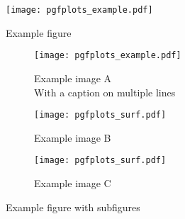 \documentclass{article}
\begin{document}
\begin{figure}
    \centering
    \texttt{[image: pgfplots\_example.pdf]}
    \caption{Example figure}
    \label{fig:example}
\end{figure}

\begin{figure}
    \centering
    \captionsetup[subfigure]{justification=centering}
    \begin{subfigure}[t]{0.3\textwidth}
        \centering
        \texttt{[image: pgfplots\_example.pdf]}
        \caption{Example image A \\ With a caption on multiple lines}
        \label{fig:example A}
    \end{subfigure}
    \hfill
    \begin{subfigure}[t]{0.3\textwidth}
        \centering
        \texttt{[image: pgfplots\_surf.pdf]}
        \caption{Example image B}
        \label{fig:example B}
    \end{subfigure}
    \hfill
    \begin{subfigure}[t]{0.3\textwidth}
        \centering
        \texttt{[image: pgfplots\_surf.pdf]}
        \caption{Example image C}
        \label{fig:example C}
    \end{subfigure}
    \caption{Example figure with subfigures}
    \label{fig:example with subfigures}
\end{figure}
\end{document}
